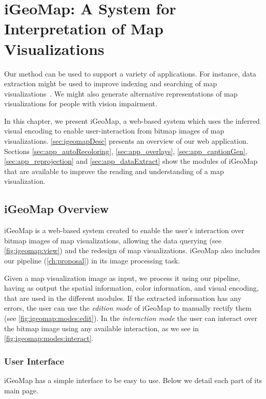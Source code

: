 \chapter{iGeoMap: A System for Interpretation of Map Visualizations}
\label{ch:igeomap}

Our method can be used to support a variety of applications. For instance, data extraction might be used to improve indexing and searching of map visualizations~\citep{Siegel2016, Walter2013}. We might also generate alternative representations of map visualizations for people with vision impairment. 

In this chapter, we present iGeoMap, a web-based system which uses the inferred visual encoding to enable user-interaction from bitmap images of map visualizations. \autoref{sec:igeomapDesc} presents an overview of our web application. Sections \ref{sec:app_autoRecoloring}, \ref{sec:app_overlays}, \ref{sec:app_captionGen}, \ref{sec:app_reprojection} and \ref{sec:app_dataExtract} show the modules of iGeoMap that are available to improve the reading and understanding of a map visualization.

\figIGMview

\section{iGeoMap Overview}
\label{sec:igeomapDesc}

iGeoMap is a web-based system created to enable the user's interaction over bitmap images of map visualizations, allowing the data querying (see \autoref{fig:igeomap:view}) and the redesign of map visualizations. iGeoMap also includes our pipeline (\autoref{ch:proposal}) in its image processing task.

Given a map visualization image as input, we process it using our pipeline, having as output the spatial information, color information, and visual encoding, that are used in the different modules. If the extracted information has any errors, the user can use the \textit{edition mode} of iGeoMap to manually rectify them (see \autoref{fig:igeomap:modes:edit}). In the \textit{interaction mode} the user can interact over the bitmap image using any available interaction, as we see in \autoref{fig:igeomap:modes:interact}.

\figIGMmodes


\subsection*{User Interface}
iGeoMap has a simple interface to be easy to use. Below we detail each part of its main page.

